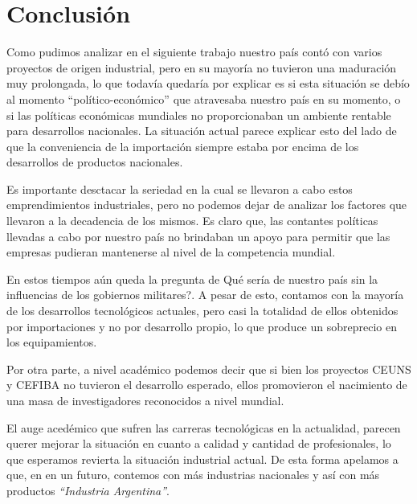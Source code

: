 \documentclass[%
  	final,
%
	notitlepage,
	narroweqnarray,
	inline,
 	twoside,
	]{ieee}
\begin{document}
\section{Conclusi\'on}

Como pudimos analizar en el siguiente trabajo nuestro pa\'is cont\'o con varios proyectos de origen industrial, pero en su mayor\'ia no tuvieron una maduraci\'on muy prolongada, lo que todav\'ia quedar\'ia por explicar es si esta situaci\'on se deb\'io al momento ``pol\'itico-econ\'omico'' que atravesaba nuestro pa\'is en su momento, o si las pol\'iticas econ\'omicas mundiales no proporcionaban un ambiente rentable para desarrollos nacionales. La situaci\'on actual parece explicar esto del lado de que la conveniencia de la importaci\'on siempre estaba por encima de los desarrollos de productos nacionales.

Es importante desctacar la seriedad en la cual se llevaron a cabo estos emprendimientos industriales, pero no podemos dejar de analizar los factores que llevaron a la decadencia de los mismos. Es claro que, las contantes pol\'iticas llevadas a cabo por nuestro pa\'is no brindaban un apoyo para permitir que las empresas pudieran mantenerse al nivel de la competencia mundial.

En estos tiempos a\'un queda la pregunta de \textquestiondown Qu\'e ser\'ia de nuestro pa\'is sin la influencias de los gobiernos militares?.
A pesar de esto, contamos con la mayor\'ia de los desarrollos tecnol\'ogicos actuales, pero casi la totalidad de ellos obtenidos por importaciones y no por desarrollo propio, lo que produce un sobreprecio en los equipamientos.

Por otra parte, a nivel acad\'emico podemos decir que si bien los proyectos CEUNS y CEFIBA no tuvieron el desarrollo esperado, ellos promovieron el nacimiento de una masa de investigadores reconocidos a nivel mundial.

El auge aced\'emico que sufren las carreras tecnol\'ogicas en la actualidad, parecen querer mejorar la situaci\'on en cuanto a calidad y cantidad de profesionales, lo que esperamos revierta la situaci\'on industrial actual. De esta forma apelamos a que, en en un futuro, contemos con m\'as industrias nacionales y as\'i con m\'as productos \textit{``Industria Argentina''}.
\end{document}
